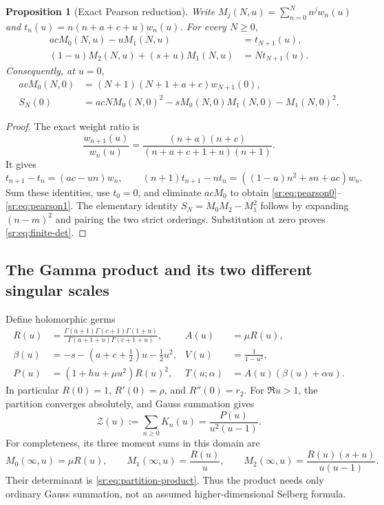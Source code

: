 \documentclass[11pt,letterpaper]{article}
\newtheorem{proposition}[theorem]{Proposition}
\theoremstyle{definition}
\theoremstyle{remark}
\numberwithin{equation}{section}
\begin{document}
\begin{proposition}[Exact Pearson reduction]\label{sr:prop:pearson}
Write $M_j(N,u)=\sum_{n=0}^N n^jw_n(u)$ and
$t_n(u)=n(n+a+c+u)w_n(u)$. For every $N\ge0$,
\begin{align}
 acM_0(N,u)-uM_1(N,u)&=t_{N+1}(u),\label{sr:eq:pearson0}\\
 (1-u)M_2(N,u)+(s+u)M_1(N,u)&=Nt_{N+1}(u).
 \label{sr:eq:pearson1}
\end{align}
Consequently, at $u=0$,
\begin{align}
 acM_0(N,0)&=(N+1)(N+1+a+c)w_{N+1}(0),\label{sr:eq:M0exact}\\
 S_N(0)&=acN M_0(N,0)^2-sM_0(N,0)M_1(N,0)-M_1(N,0)^2.
 \label{sr:eq:finite-det}
\end{align}
\end{proposition}
\begin{proof}
The exact weight ratio is
\[
 \frac{w_{n+1}(u)}{w_n(u)}
 =\frac{(n+a)(n+c)}{(n+a+c+1+u)(n+1)}.
\]
It gives
\[
 t_{n+1}-t_n=(ac-un)w_n,
 \qquad
 (n+1)t_{n+1}-nt_n=((1-u)n^2+sn+ac)w_n.
\]
Sum these identities, use $t_0=0$, and eliminate $acM_0$ to obtain
\eqref{sr:eq:pearson0}--\eqref{sr:eq:pearson1}. The elementary identity
$S_N=M_0M_2-M_1^2$ follows by expanding $(n-m)^2$ and pairing the two
strict orderings. Substitution at zero proves \eqref{sr:eq:finite-det}.
\end{proof}

\subsection{The Gamma product and its two different singular scales}
Define holomorphic germs
\begin{align}
 R(u)&=\frac{\Gamma(a+1)\Gamma(c+1)\Gamma(1+u)}
 {\Gamma(a+1+u)\Gamma(c+1+u)},& A(u)&=\mu R(u),\label{sr:eq:R}\\
 \beta(u)&=-s-(a+c+\tfrac12)u-\tfrac12u^2,
 &V(u)&=\frac1{1-u^2},\label{sr:eq:beta}\\
 P(u)&=(1+hu+\mu u^2)R(u)^2,
 &T(u;\alpha)&=A(u)(\beta(u)+\alpha u).
 \label{sr:eq:PT}
\end{align}
In particular $R(0)=1$, $R'(0)=\rho$, and $R''(0)=r_2$.
For $\Re u>1$, the partition converges absolutely, and Gauss summation
\cite[15.4.20]{dlmfgauss} gives
\begin{equation}\label{sr:eq:partition-product}
 \mathcal Z(u):=\sum_{n\ge0}K_n(u)
 =\frac{P(u)}{u^2(u-1)}.
\end{equation}
For completeness, its three moment sums in this domain are
\[
 M_0(\infty,u)=\mu R(u),\qquad
 M_1(\infty,u)=\frac{R(u)}u,\qquad
 M_2(\infty,u)=\frac{R(u)(s+u)}{u(u-1)}.
\]
Their determinant is \eqref{sr:eq:partition-product}. Thus the product
needs only ordinary Gauss summation, not an assumed higher-dimensional
Selberg formula.
\end{document}
